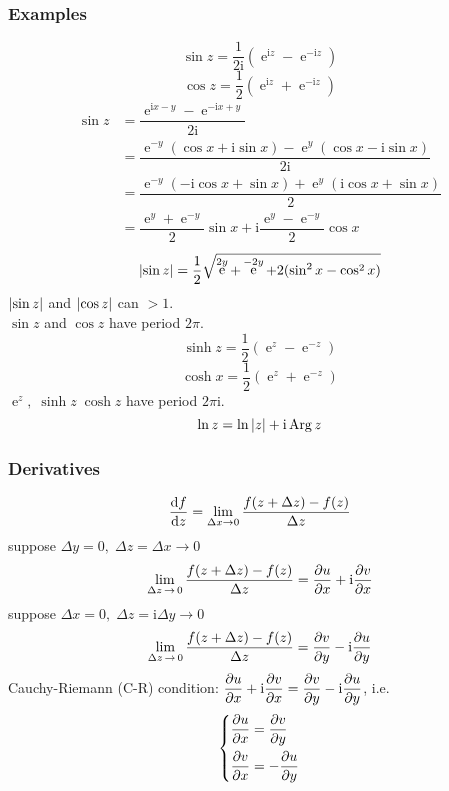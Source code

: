 \documentclass[UTF8]{ctexart} %
\DeclareMathOperator{\e}{\mathrm{e}}
\renewcommand{\I}{\mathrm{i}}
\DeclareMathOperator{\Arg}{\mathrm{Arg}}
\DeclareMathOperator{\ra}{\rightarrow}
\newcommand{\dis}{\displaystyle}
\numberwithin{equation}{section}
\begin{document}
\subsubsection{Examples}
\begin{equation}\label{key}
\sin z=\dfrac{1}{2\I}(\e^{\I z}-\e^{-\I z})
\end{equation}
\begin{equation}\label{key}
\cos z=\dfrac{1}{2}(\e^{\I z}+\e^{-\I z})
\end{equation}
\begin{equation}\label{key}
\begin{aligned}
\sin z&=\dfrac{\e^{\I x-y}-\e^{-\I x+y}}{2\I}\\
&=\dfrac{\e^{-y}(\cos x+\I\sin x)-\e^y(\cos x-\I\sin x)}{2\I}\\
&=\dfrac{\e^{-y}(-\I\cos x+\sin x)+\e^y(\I\cos x+\sin x)}{2}\\
&=\dfrac{\e^y+\e^{-y}}{2}\sin x + \I\dfrac{\e^y-\e^{-y}}{2}\cos x
\end{aligned}
\end{equation}
\begin{equation}\label{key}
\abs{\sin z}=\dfrac{1}{2}\sqrt{\e^{2y}+\e^{-2y}+2(\sin^2 x-\cos^2 x)}
\end{equation}
$\abs{\sin z}$ and $\abs{\cos z}$ can $>1$.\\
$\sin z$ and $\cos z$ have period $2\pi$.\\
\begin{equation}\label{key}
\sinh z=\dfrac{1}{2}(\e^z-\e^{-z})
\end{equation}
\begin{equation}\label{key}
\cosh x=\dfrac{1}{2}(\e^z+\e^{-z})
\end{equation}
$\e^z,\;\sinh z\;\cosh z$ have period $2\pi\I$.
\begin{equation}\label{key}
\ln z = \ln\abs{z} + \I\Arg z
\end{equation}
\subsubsection{Derivatives}
\begin{equation}\label{key}
\dv{f}{z}=\lim_{\Delta x\rightarrow 0}\dfrac{f(z+\Delta z)-f(z)}{\Delta z}
\end{equation}
suppose $\Delta y = 0,\;\Delta z=\Delta x \ra 0$
\begin{equation}\label{key}
\lim_{\Delta z \ra 0} \dfrac{f(z+\Delta z)-f(z)}{\Delta z}=\pdv{u}{x}+\I\pdv{v}{x}
\end{equation}
suppose $\Delta x = 0,\;\Delta z=\I\Delta y \ra 0$
\begin{equation}\label{key}
\lim_{\Delta z \ra 0} \dfrac{f(z+\Delta z)-f(z)}{\Delta z} = \pdv{v}{y} - \I\pdv{u}{y}
\end{equation}
Cauchy-Riemann (C-R) condition: $\dis\pdv{u}{x}+\I\dis\pdv{v}{x} = \dis\pdv{v}{y} - \I\dis\pdv{u}{y}$, i.e.
\begin{equation}\label{key}
\left\{\begin{aligned}
\pdv{u}{x} &= \pdv{v}{y}\\
\pdv{v}{x} &= -\pdv{u}{y}
\end{aligned}\right.
\end{equation}
\end{document}
